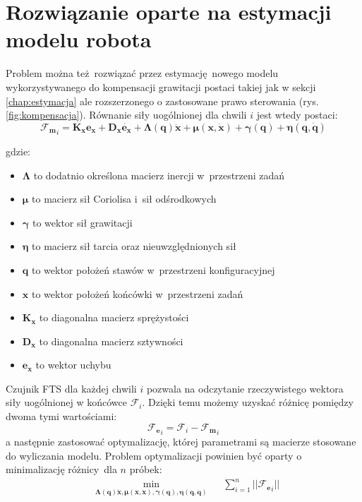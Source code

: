 \section{Rozwiązanie oparte na estymacji modelu robota}
\label{chap:rozw_model}
Problem można też rozwiązać przez estymację nowego modelu wykorzystywanego do kompensacji grawitacji postaci takiej jak w sekcji \ref{chap:estymacja} ale rozszerzonego o zastosowane prawo sterowania \cite{bib:rozw_opt1, bib:rozw_opt2} (rys. \ref{fig:kompensacja}). Równanie siły uogólnionej dla chwili $i$ jest wtedy postaci:
\begin{equation}
\boldsymbol{\mathcal{F}_{m}}_i = \boldsymbol{K_x}\boldsymbol{e_x} + \boldsymbol{D_x}\dot{\boldsymbol{e_x}} + \boldsymbol{\Lambda}(\boldsymbol{q})\boldsymbol{\ddot{x}} + \boldsymbol{\mu}(\boldsymbol{x}, \boldsymbol{\dot{x}}) + \boldsymbol{\gamma}(\boldsymbol{q}) + \boldsymbol{\eta}(\boldsymbol{q}, \boldsymbol{\dot{q}})
\end{equation}

gdzie: 

\begin{itemize}
	\item $\boldsymbol{\Lambda}$ to dodatnio określona macierz inercji w~przestrzeni zadań
	\item $\boldsymbol{\mu}$ to macierz sił Coriolisa i~sił odśrodkowych	
	\item $\boldsymbol{\gamma}$ to wektor sił grawitacji
	\item $\boldsymbol{\eta}$ to macierz sił tarcia oraz nieuwzględnionych sił
	\item $\boldsymbol{q}$ to wektor położeń stawów w~przestrzeni konfiguracyjnej
	\item $\boldsymbol{x}$ to wektor położeń końcówki w~przestrzeni zadań
	\item $\boldsymbol{K_x}$ to diagonalna macierz sprężystości
	\item $\boldsymbol{D_x}$ to diagonalna macierz sztywności
	\item $\boldsymbol{e_x}$ to wektor uchybu
\end{itemize} 


Czujnik FTS dla każdej chwili $i$ pozwala na odczytanie rzeczywistego wektora siły uogólnionej w końcówce $\boldsymbol{\mathcal{F}}_i$. Dzięki temu możemy uzyskać różnicę pomiędzy dwoma tymi wartościami:
\begin{equation}
\boldsymbol{\mathcal{F}_{e}}_i = \boldsymbol{\mathcal{F}}_{i} - \boldsymbol{\mathcal{F}_{m}}_i
\end{equation}
a następnie zastosować optymalizację, której parametrami są macierze stosowane do wyliczania modelu. Problem optymalizacji powinien być oparty o minimalizację różnicy dla $n$ próbek:
\begin{equation}
\begin{aligned}
& \underset{\boldsymbol{\Lambda}(\boldsymbol{q})\boldsymbol{\ddot{x}}, \boldsymbol{\mu}(\boldsymbol{x}, \boldsymbol{\dot{x}}), \boldsymbol{\gamma}(\boldsymbol{q}), \boldsymbol{\eta}(\boldsymbol{q}, \boldsymbol{\dot{q}})}{\text{min}}
& & \sum_{i = 1}^{n} || \boldsymbol{\mathcal{F}_{e}}_i ||
\end{aligned}
\end{equation}


